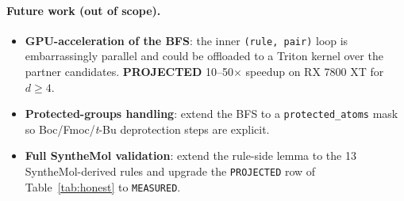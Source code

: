 \paragraph{Future work (out of scope).}
\begin{itemize}
  \item \textbf{GPU-acceleration of the BFS}: the inner
        \texttt{(rule, pair)} loop is embarrassingly parallel and
        could be offloaded to a Triton kernel over the partner
        candidates.  \textbf{PROJECTED} 10--50$\times$ speedup on
        RX 7800 XT for $d \ge 4$.
  \item \textbf{Protected-groups handling}: extend the BFS to a
        \texttt{protected\_atoms} mask so Boc/Fmoc/\textit{t}-Bu
        deprotection steps are explicit.
  \item \textbf{Full SyntheMol validation}: extend the
        rule-side lemma to the 13 SyntheMol-derived rules and
        upgrade the \texttt{PROJECTED} row of
        Table~\ref{tab:honest} to \texttt{MEASURED}.
\end{itemize}

\endinput
